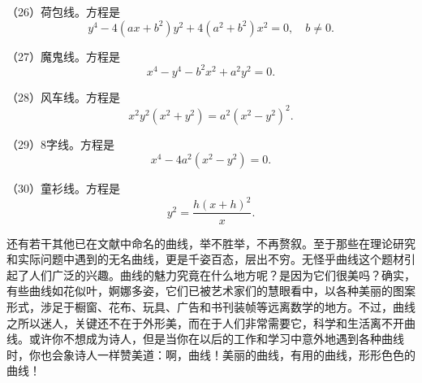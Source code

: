 （26）荷包线。方程是
\[
  y^4 - 4(ax + b^2)y^2 + 4(a^2 + b^2)x^2 = 0, \quad b \neq 0.
\]

（27）魔鬼线。方程是
\[
  x^4 - y^4 - b^2 x^2 + a^2 y^2 = 0.
\]

（28）风车线。方程是
\[
  x^2 y^2(x^2 + y^2) = a^2(x^2 - y^2)^2.
\]

（29）8字线。方程是
\[
  x^4 - 4a^2(x^2 - y^2) = 0.
\]

（30）童衫线。方程是
\[
  y^2 = \frac{h(x + h)^2}{x}.
\]

还有若干其他已在文献中命名的曲线，举不胜举，不再赘叙。至于那些在理论研究和实际问题中遇到的无名曲线，更是千姿百态，层出不穷。无怪乎曲线这个题材引起了人们广泛的兴趣。曲线的魅力究竟在什么地方呢？是因为它们很美吗？确实，有些曲线如花似叶，婀娜多姿，它们已被艺术家们的慧眼看中，以各种美丽的图案形式，涉足于橱窗、花布、玩具、广告和书刊装帧等远离数学的地方。不过，曲线之所以迷人，关键还不在于外形美，而在于人们非常需要它，科学和生活离不开曲线。或许你不想成为诗人，但是当你在以后的工作和学习中意外地遇到各种曲线时，你也会象诗人一样赞美道：啊，曲线！美丽的曲线，有用的曲线，形形色色的曲线！
